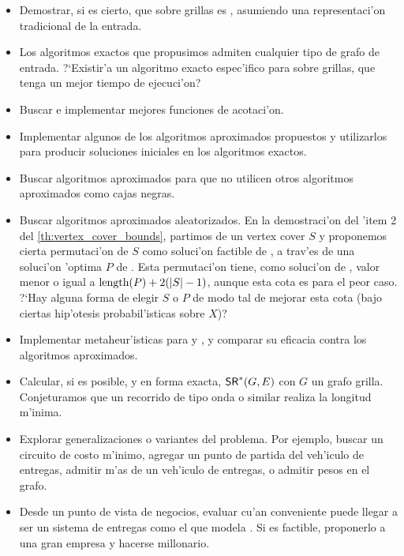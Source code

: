 \begin{itemize}
	\item Demostrar, si es cierto, que  sobre grillas es , asumiendo una representaci'on tradicional de la entrada.
	\item Los algoritmos exactos que propusimos admiten cualquier tipo de grafo de entrada. ?`Existir'a un algoritmo exacto espec'ifico para  sobre grillas, que tenga un mejor tiempo de ejecuci'on?
	\item Buscar e implementar mejores funciones de acotaci'on.
	\item Implementar algunos de los algoritmos aproximados propuestos y utilizarlos para producir soluciones iniciales en los algoritmos exactos.
	\item Buscar algoritmos aproximados para  que no utilicen otros algoritmos aproximados como cajas negras.
	\item Buscar algoritmos aproximados aleatorizados. En la demostraci'on del 'item 2 del \autoref{th:vertex_cover_bounds}, partimos de un vertex cover $S$ y proponemos cierta permutaci'on de $S$ como soluci'on factible de , a trav'es de una soluci'on 'optima $P$ de . Esta permutaci'on tiene, como soluci'on de , valor menor o igual a $\textnormal{length}(P) + 2(|S| - 1)$, aunque esta cota es para el peor caso. ?`Hay alguna forma de elegir $S$ o $P$ de modo tal de mejorar esta cota (bajo ciertas hip'otesis probabil'isticas sobre $X$)?
	\item Implementar metaheur'isticas para  y , y comparar su eficacia contra los algoritmos aproximados.
	\item Calcular, si es posible, y en forma exacta, $\textnormal{\textsf{SR}}^*(G, E)$ con $G$ un grafo grilla. Conjeturamos que un recorrido de tipo onda o similar realiza la longitud m'inima.
	\item Explorar generalizaciones o variantes del problema. Por ejemplo, buscar un circuito de costo m'inimo, agregar un punto de partida del veh'iculo de entregas, admitir m'as de un veh'iculo de entregas, o admitir pesos en el grafo.
	\item Desde un punto de vista de negocios, evaluar cu'an conveniente puede llegar a ser un sistema de entregas como el que modela . Si es factible, proponerlo a una gran empresa y hacerse millonario.
\end{itemize}